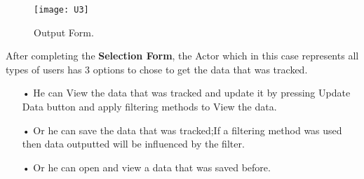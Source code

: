 \newpage \begin{figure}[h!]
	\centering
	\texttt{[image: U3]}
	\caption{Output Form.} 
\end{figure}
\begin{flushleft}
After completing the \textbf{Selection Form}, the Actor which in this case represents all types of users has 3 options to chose to get the data that was tracked.
\begin{enumerate}
		\item[•] He can View the data that was tracked and update it by pressing Update Data button and apply filtering methods to View the data.
		\item[•] Or he can save the data that was tracked;If a filtering method was used then data outputted will be influenced by the filter. 
		\item[•] Or he can open and view a data that was saved before.
\end{enumerate}
\end{flushleft}
\newpage
